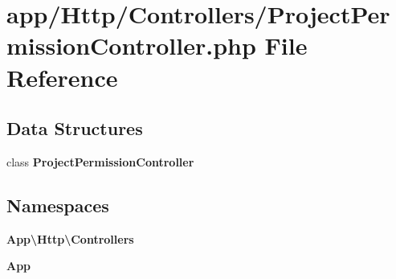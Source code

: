 \section{app/\+Http/\+Controllers/\+Project\+Permission\+Controller.php File Reference}
\label{_project_permission_controller_8php}
\subsection*{Data Structures}
\begin{DoxyCompactItemize}
\item 
class {\bf Project\+Permission\+Controller}
\end{DoxyCompactItemize}
\subsection*{Namespaces}
\begin{DoxyCompactItemize}
\item 
 {\bf App\textbackslash{}\+Http\textbackslash{}\+Controllers}
\item 
 {\bf App}
\end{DoxyCompactItemize}
